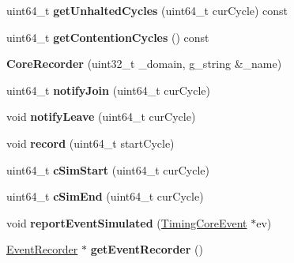 \begin{DoxyCompactItemize}
\item 
\hypertarget{classCoreRecorder_ae30f7a903534b835fb3eae65728e903f}{uint64\-\_\-t {\bfseries get\-Unhalted\-Cycles} (uint64\-\_\-t cur\-Cycle) const }\label{classCoreRecorder_ae30f7a903534b835fb3eae65728e903f}

\item 
\hypertarget{classCoreRecorder_a3f0d400abd3c59e92dad3424b3319400}{uint64\-\_\-t {\bfseries get\-Contention\-Cycles} () const }\label{classCoreRecorder_a3f0d400abd3c59e92dad3424b3319400}

\item 
\hypertarget{classCoreRecorder_a9817e576d86284d031cfdde850421465}{{\bfseries Core\-Recorder} (uint32\-\_\-t \-\_\-domain, g\-\_\-string \&\-\_\-name)}\label{classCoreRecorder_a9817e576d86284d031cfdde850421465}

\item 
\hypertarget{classCoreRecorder_a75258d05bd878d2c24692ea126fa0fca}{uint64\-\_\-t {\bfseries notify\-Join} (uint64\-\_\-t cur\-Cycle)}\label{classCoreRecorder_a75258d05bd878d2c24692ea126fa0fca}

\item 
\hypertarget{classCoreRecorder_a5de90ebbe596f875c59b876c25ac5e4e}{void {\bfseries notify\-Leave} (uint64\-\_\-t cur\-Cycle)}\label{classCoreRecorder_a5de90ebbe596f875c59b876c25ac5e4e}

\item 
\hypertarget{classCoreRecorder_a6bb5ab211da547753d433832c30324f3}{void {\bfseries record} (uint64\-\_\-t start\-Cycle)}\label{classCoreRecorder_a6bb5ab211da547753d433832c30324f3}

\item 
\hypertarget{classCoreRecorder_a3b68c6854d37e643982f1111d4244e9f}{uint64\-\_\-t {\bfseries c\-Sim\-Start} (uint64\-\_\-t cur\-Cycle)}\label{classCoreRecorder_a3b68c6854d37e643982f1111d4244e9f}

\item 
\hypertarget{classCoreRecorder_ac09b4e16164bce69aa47bda2e406b61d}{uint64\-\_\-t {\bfseries c\-Sim\-End} (uint64\-\_\-t cur\-Cycle)}\label{classCoreRecorder_ac09b4e16164bce69aa47bda2e406b61d}

\item 
\hypertarget{classCoreRecorder_a225bf52a8b8655954392caa90a2ae5df}{void {\bfseries report\-Event\-Simulated} (\hyperlink{classTimingCoreEvent}{Timing\-Core\-Event} $\ast$ev)}\label{classCoreRecorder_a225bf52a8b8655954392caa90a2ae5df}

\item 
\hypertarget{classCoreRecorder_a2d23b6db5507453886f42deee7150994}{\hyperlink{classEventRecorder}{Event\-Recorder} $\ast$ {\bfseries get\-Event\-Recorder} ()}\label{classCoreRecorder_a2d23b6db5507453886f42deee7150994}


\end{DoxyCompactItemize}
